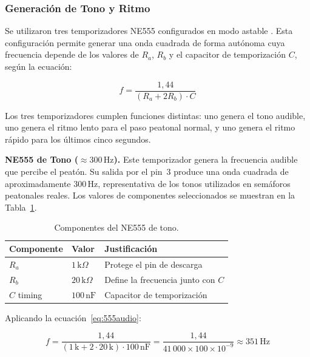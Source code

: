 \documentclass[12pt,onecolumn]{IEEEtran}
\begin{document}
\subsubsection{Generación de Tono y Ritmo}

Se utilizaron tres temporizadores NE555 configurados en modo astable \cite{ne555art}. Esta configuración permite generar una onda cuadrada de forma autónoma cuya frecuencia depende de los valores de $R_a$, $R_b$ y el capacitor de temporización $C$, según la ecuación:

\begin{equation}
    f = \frac{1{,}44}{(R_a + 2R_b)\cdot C}
    \label{eq:555audio}
\end{equation}

Los tres temporizadores cumplen funciones distintas: uno genera el tono audible, uno genera el ritmo lento para el paso peatonal normal, y uno genera el ritmo rápido para los últimos cinco segundos.

\textbf{NE555 de Tono ($\approx 300\,\text{Hz}$).}
Este temporizador genera la frecuencia audible que percibe el peatón. Su salida por el pin~3 produce una onda cuadrada de aproximadamente $300\,\text{Hz}$, representativa de los tonos utilizados en semáforos peatonales reales. Los valores de componentes seleccionados se muestran en la Tabla~\ref{tab:555tono}.

\begin{table}[H]
\centering
\caption{Componentes del NE555 de tono.}
\label{tab:555tono}
\begin{tabular}{lll}
\toprule
\textbf{Componente} & \textbf{Valor} & \textbf{Justificación} \\
\midrule
$R_a$       & $1\,\text{k}\Omega$   & Protege el pin de descarga \\
$R_b$       & $20\,\text{k}\Omega$  & Define la frecuencia junto con $C$ \\
$C$ timing  & $100\,\text{nF}$      & Capacitor de temporización \\
\bottomrule
\end{tabular}
\end{table}

Aplicando la ecuación~\eqref{eq:555audio}:

\begin{equation}
    f = \frac{1{,}44}{(1\,\text{k} + 2\cdot 20\,\text{k})\cdot 100\,\text{nF}}
      = \frac{1{,}44}{41\,000 \times 100\times10^{-9}}
      \approx 351\,\text{Hz}
\end{equation}
\end{document}
